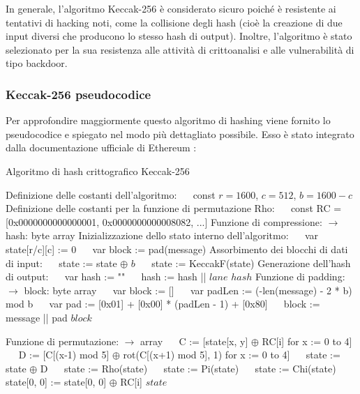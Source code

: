 \documentclass[a4paper,11pt]{report}
\begin{document}
In generale, l'algoritmo Keccak-256 è considerato sicuro poiché è resistente ai tentativi di hacking noti, come la collisione degli hash (cioè la creazione di due input diversi che producono lo stesso hash di output). Inoltre, l'algoritmo è stato selezionato per la sua resistenza alle attività di crittoanalisi e alle vulnerabilità di tipo backdoor.

\subsubsection{Keccak-256 pseudocodice}
Per approfondire maggiormente questo algoritmo di hashing viene fornito lo pseudocodice e spiegato nel modo più dettagliato possibile. Esso è stato integrato dalla documentazione ufficiale di Ethereum \cite{ETH}:
\begin{algorithm}
\caption{Algoritmo di hash crittografico Keccak-256}
\begin{algorithmic}[1]
\State Definizione delle costanti dell'algoritmo:
\State $\quad$ const $r = 1600$, $c = 512$, $b = 1600 - c$
\State Definizione delle costanti per la funzione di permutazione Rho:
\State $\quad$ const RC = [0x0000000000000001, 0x0000000000008082, ...]
\State Funzione di compressione:
 $\rightarrow$ {hash: byte array}
\State Inizializzazione dello stato interno dell'algoritmo:
\State $\quad$ var state[r/c][c] := 0
\State $\quad$ var block := pad(message)
\State Assorbimento dei blocchi di dati di input:
\State $\quad$ state := state $\oplus$ $b$
\State $\quad$ state := KeccakF(state)
\EndFor
\State Generazione dell'hash di output:
\State $\quad$ var hash := ""
\State $\quad$ hash := hash || $lane$
\EndFor
\EndFor
\State \Return $hash$
\EndFunction
\State Funzione di padding:
 $\rightarrow$ {block: byte array}
\State $\quad$ var block := []
\State $\quad$ var padLen := (-len(message) - 2 * b) mod b
\State $\quad$ var pad := [0x01] + [0x00] * (padLen - 1) + [0x80]
\State $\quad$ block := message || pad
\State \Return $block$
\EndFunction

\State Funzione di permutazione:
 $\rightarrow$ {array}
\State $\quad$ C := [state[x, y] $\oplus$ RC[i] for x := 0 to 4]
\State $\quad$ D := [C[(x-1) mod 5] $\oplus$ rot(C[(x+1) mod 5], 1) for x := 0 to 4]
\State $\quad$ state := state $\oplus$ D
\State $\quad$ state := Rho(state)
\State $\quad$ state := Pi(state)
\State $\quad$ state := Chi(state)
\State $\quad$ state[0, 0] := state[0, 0] $\oplus$ RC[i]
\EndFor
\State \Return $state$
\EndFunction
\end{algorithmic}
\end{algorithm}
\end{document}
